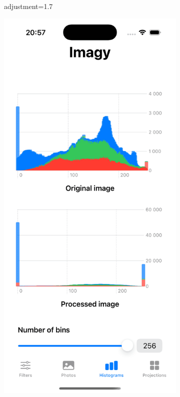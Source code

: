 \documentclass[a4paper]{article}
\begin{document}
\begin{figure}[H]
\begin{subfigure}{0.2\textwidth}
        \caption{adjustment=1.7}
        \label{fig:trees_saturation_1}
    \end{subfigure}
    \hfill
    \begin{subfigure}{0.2\textwidth}
        \centering
        \includegraphics[width=\linewidth]{images/trees_saturation_2.0_historgram.png}

\end{subfigure}
\end{figure}
\end{document}
